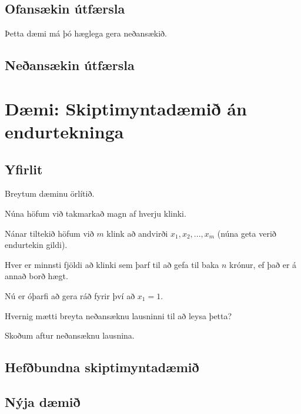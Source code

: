 \subsection{Ofansækin útfærsla}
{
}

{
    {
        \item<1-> Þetta dæmi má þó hæglega gera neðansækið.
    }
}

\subsection{Neðansækin útfærsla}
{
}

\section{Dæmi: Skiptimyntadæmið án endurtekninga}
\subsection{Yfirlit}
{
    {
        \item<1-> Breytum dæminu örlítið.
        \item<2-> Núna höfum við takmarkað magn af hverju klinki.
        \item<3-> Nánar tiltekið höfum við $m$ klink að andvirði $x_1, x_2, ..., x_m$ (núna geta verið endurtekin gildi).
        \item<4-> Hver er minnsti fjöldi að klinki sem þarf til að gefa til baka $n$ krónur, ef það er á annað borð hægt.
        \item<5-> Nú er óþarfi að gera ráð fyrir því að $x_1 = 1$.
        \item<6-> Hvernig mætti breyta neðansæknu lausninni til að leysa þetta?
        \item<7-> Skoðum aftur neðansæknu lausnina.
    }
}

\subsection{Hefðbundna skiptimyntadæmið}
{
}

\subsection{Nýja dæmið}
{
}

